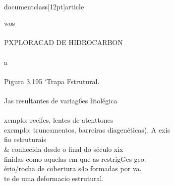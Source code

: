 \\documentclass[12pt]{article}
\begin{document}
wos\\
\\
PXPLORACAD DE HIDROCARBON\\
\\
a\\
\\
Pigura 3.195 ‘Trapa Fstrutural.\\
\\
Jas resultantes de variag6es litolégica\\
\\
xemplo: recifes, lentes de atenttones\\
exemplo: truncamentos, barreiras diagenéticas). A exis\\
fio estruturais \\& conhecida desde o final do século xix\\
finidas como aquelas em que as restrigGes geo.\\
ério/rocha de cobertura s4o formadas por va.\\
te de uma deformacio estrutural.\\
\\
\end{document}
